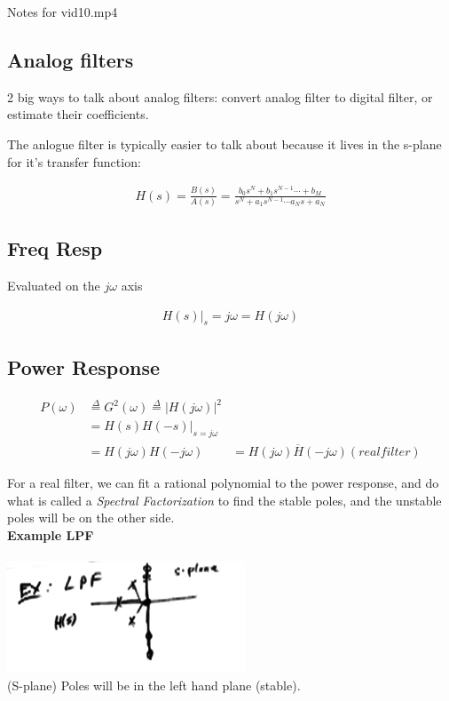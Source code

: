 Notes for vid10.mp4

\subsection*{Analog filters}

2 big ways to talk about analog filters: convert analog filter to
digital filter, or estimate their coefficients. 

The anlogue filter is typically easier to talk about because it lives
in the s-plane for it's transfer function:

\begin{align*}
    H(s) = \frac{B(s)}{A(s)} = 
    \frac{
        b_0 s^N + b_1 s^{N-1} \cdots + b_M
    } {
        s^N + a_1 s^{N-1} \cdots a_N s + a_N
    }
\end{align*}

\subsection*{Freq Resp}

Evaluated on the $j\omega$ axis

\begin{align*}
    H(s) \vert_s=j\omega = H(j\omega)
\end{align*}

\subsection*{Power Response}

\begin{align*}
    P(\omega) 
    &\stackrel{\Delta}{=} G^2(\omega) 
    \stackrel{\Delta}{=}
    \vert H(j \omega) \vert^2 \\
    &= H(s)H(-s)\vert_{s=j\omega} \\
    &= H(j \omega)H(-j\omega) 
    &= \overline{H(j \omega)H(-j\omega)} (real filter)
\end{align*}

For a real filter, we can fit a rational polynomial to the power response, 
and do what is called a \textit{Spectral Factorization} to find the
stable poles, and the unstable poles will be on the other side.\\

\textbf{Example LPF}\\

\\
\includegraphics[scale=0.5]{frames/14a}\\
(S-plane) Poles will be in the left hand plane (stable). 

